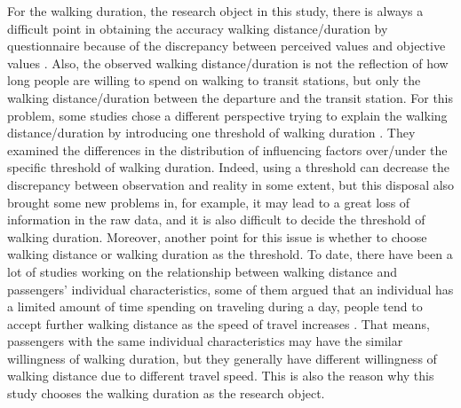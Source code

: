 \documentclass[Journal,letterpaper]{ascelike-new}
\begin{document}
%
For the walking duration, the research object in this study, there is always a difficult point in obtaining the accuracy walking distance/duration by questionnaire because of the discrepancy between perceived values and objective values \cite{BadlandHannahMandSchofieldGrantMandSchluter2007,McCormack2008}. Also, the observed walking distance/duration is not the reflection of how long people are willing to spend on walking to transit stations, but only the walking distance/duration between the departure and the transit station. For this problem, some studies chose a different perspective trying to explain the walking distance/duration by introducing one threshold of walking duration \cite{Besser2005,McCormack2008}. They examined the differences in the distribution of influencing factors over/under the specific threshold of walking duration. Indeed, using a threshold can decrease the discrepancy between observation and reality in some extent, but this disposal also brought some new problems in, for example, it may lead to a great loss of information in the raw data, and it is also difficult to decide the threshold of walking duration. Moreover, another point for this issue is whether to choose walking distance or walking duration as the threshold. To date, there have been a lot of studies working on the relationship between walking distance and passengers' individual characteristics, some of them argued that an individual has a limited amount of time spending on traveling during a day, people tend to accept further walking distance as the speed of travel increases \cite{Marchetti1994,Larsen2010}. That means, passengers with the same individual characteristics may have the similar willingness of walking duration, but they generally have different willingness of walking distance due to different travel speed. This is also the reason why this study chooses the walking duration as the research object.
\end{document}

